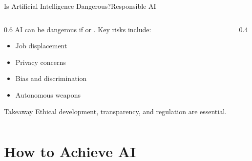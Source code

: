 \documentclass[aspectratio=169,11pt]{beamer}
\begin{document}
\begin{frame}{Is Artificial Intelligence Dangerous?}{Responsible AI}
  \begin{columns}[T]
    \begin{column}{0.6\textwidth}
      AI can be dangerous if  or .
      Key risks include:
      \begin{itemize}
        \item Job displacement
        \item Privacy concerns
        \item Bias and discrimination
        \item Autonomous weapons
      \end{itemize}
      \vspace{0.4em}
      \begin{exampleblock}{Takeaway}
        \small Ethical development, transparency, and regulation are essential.
      \end{exampleblock}
    \end{column}
    \begin{column}{0.4\textwidth}
      \centering
    \end{column}
  \end{columns}
\end{frame}

\section{How to Achieve AI}
\end{document}
